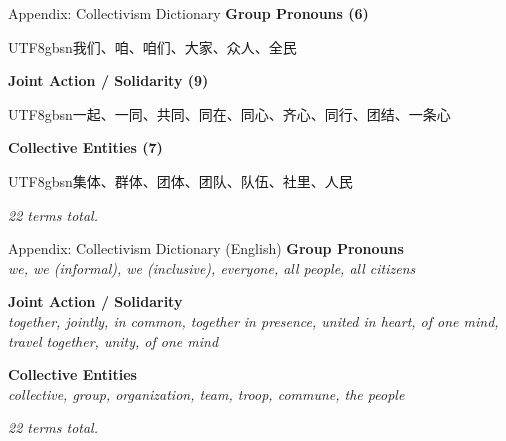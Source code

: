 \documentclass[aspectratio=169]{beamer}
\begin{document}
\begin{frame}[label=appendix-collec-dict]{Appendix: Collectivism Dictionary}
\footnotesize
  \textbf{Group Pronouns (6)} \\
  \begin{CJK}{UTF8}{gbsn}我们、咱、咱们、大家、众人、全民\end{CJK}

  \smallskip
  \textbf{Joint Action / Solidarity (9)} \\
  \begin{CJK}{UTF8}{gbsn}一起、一同、共同、同在、同心、齐心、同行、团结、一条心\end{CJK}

  \smallskip
  \textbf{Collective Entities (7)} \\
  \begin{CJK}{UTF8}{gbsn}集体、群体、团体、团队、队伍、社里、人民\end{CJK}

  \smallskip
  \textit{22 terms total.}

\vspace{0.4em}
\hyperlink{appendix-indiv-dict}{}
\hfill
\hyperlink{appendix-collec-dict-en}{}
\hspace{0.3em}
\hyperlink{slide-dictmeasures}{}
\end{frame}

\begin{frame}[label=appendix-collec-dict-en]{Appendix: Collectivism Dictionary (English)}
\footnotesize
  \textbf{Group Pronouns} \\
  \textit{we, we (informal), we (inclusive), everyone, all people, all citizens}

  \smallskip
  \textbf{Joint Action / Solidarity} \\
  \textit{together, jointly, in common, together in presence, united in heart, of one mind, travel together, unity, of one mind}

  \smallskip
  \textbf{Collective Entities} \\
  \textit{collective, group, organization, team, troop, commune, the people}

  \smallskip
  \textit{22 terms total.}

\vspace{0.4em}
\hyperlink{appendix-collec-dict}{}
\hfill
\hyperlink{appendix-indiv-dict}{}
\end{frame}
\end{document}
